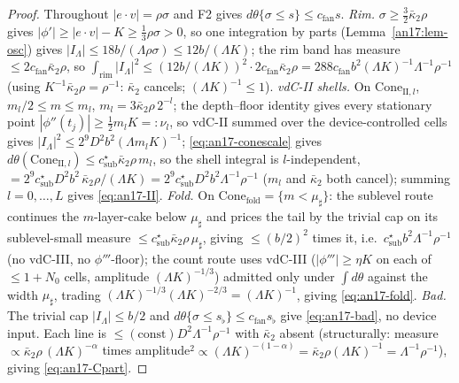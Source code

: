 \begin{proof}
Throughout $|e\cdot v|=\rho\sigma$ and F2 gives $d\theta\{\sigma\le s\}\le
c_{\mathrm{fan}}s$. \emph{Rim.} $\sigma\ge\tfrac32\bar\kappa_2\rho$ gives
$|\phi'|\ge|e\cdot v|-K\ge\tfrac13\rho\sigma>0$, so one integration by parts
(Lemma~\ref{an17:lem-osc}) gives $|I_\Lambda|\le18b/(\Lambda\rho\sigma)\le
12b/(\Lambda K)$; the rim band has measure $\le2c_{\mathrm{fan}}\bar\kappa_2\rho$,
so $\int_{\mathrm{rim}}|I_\Lambda|^2\le(12b/(\Lambda K))^2\cdot 2c_{\mathrm{fan}}
\bar\kappa_2\rho=288c_{\mathrm{fan}}b^2(\Lambda K)^{-1}\Lambda^{-1}\rho^{-1}$
(using $K^{-1}\bar\kappa_2\rho=\rho^{-1}$: $\bar\kappa_2$ cancels; $(\Lambda K)^{-1}
\le1$). \emph{vdC-II shells.} On $\mathrm{Cone}_{\mathrm{II},l}$, $m_l/2\le m\le
m_l$, $m_l=3\bar\kappa_2\rho\,2^{-l}$; the depth--floor identity gives every
stationary point $|\phi''(t_j)|\ge\tfrac12 m_lK=:\nu_l$, so vdC-II summed over the
device-controlled cells gives $|I_\Lambda|^2\le 2^9D^2b^2(\Lambda m_lK)^{-1}$;
\eqref{eq:an17-conescale} gives $d\theta(\mathrm{Cone}_{\mathrm{II},l})\le
c_{\mathrm{sub}}^\star\bar\kappa_2\rho\,m_l$, so the shell integral is
$l$-independent, $=2^9c_{\mathrm{sub}}^\star D^2b^2\,\bar\kappa_2\rho/(\Lambda K)=
2^9c_{\mathrm{sub}}^\star D^2b^2\Lambda^{-1}\rho^{-1}$ ($m_l$ and $\bar\kappa_2$
both cancel); summing $l=0,\dots,L$ gives \eqref{eq:an17-II}. \emph{Fold.} On
$\mathrm{Cone}_{\mathrm{fold}}=\{m<\mu_\sharp\}$: the sublevel route continues the
$m$-layer-cake below $\mu_\sharp$ and prices the tail by the trivial cap on its
sublevel-small measure $\le c_{\mathrm{sub}}^\star\bar\kappa_2\rho\,\mu_\sharp$,
giving $\le(b/2)^2$ times it, i.e.\ $c_{\mathrm{sub}}^\star b^2\Lambda^{-1}
\rho^{-1}$ (no vdC-III, no $\phi'''$-floor); the count route uses vdC-III
($|\phi'''|\ge\eta K$ on each of $\le1+N_0$ cells, amplitude $(\Lambda K)^{-1/3}$)
admitted only under $\int d\theta$ against the width $\mu_\sharp$, trading
$(\Lambda K)^{-1/3}(\Lambda K)^{-2/3}=(\Lambda K)^{-1}$, giving \eqref{eq:an17-fold}.
\emph{Bad.} The trivial cap $|I_\Lambda|\le b/2$ and $d\theta\{\sigma\le s_\flat\}
\le c_{\mathrm{fan}}s_\flat$ give \eqref{eq:an17-bad}, no device input. Each line is
$\le(\text{const})D^2\Lambda^{-1}\rho^{-1}$ with $\bar\kappa_2$ absent
(structurally: measure $\propto\bar\kappa_2\rho\,(\Lambda K)^{-\alpha}$ times
amplitude$^2\propto(\Lambda K)^{-(1-\alpha)}=\bar\kappa_2\rho(\Lambda K)^{-1}=
\Lambda^{-1}\rho^{-1}$), giving \eqref{eq:an17-Cpart}.
\end{proof}

